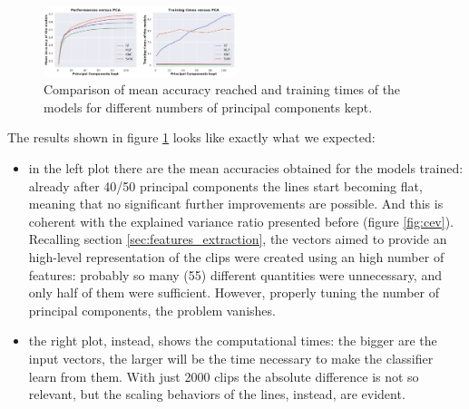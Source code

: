 \begin{figure}[!h]
	\centering
	\includegraphics[width=0.5\textwidth]{pictures/pca_analysis.pdf}
	\caption{Comparison of mean accuracy reached and training times of the models for different numbers of principal components kept.}
	\label{fig:pca_analysis}
\end{figure}
The results shown in figure \ref{fig:pca_analysis} looks like exactly what we expected:
\begin{itemize}
	\itemsep0em
	\item in the left plot there are the mean accuracies obtained for the models trained: already after 40/50 principal components the lines start becoming flat, meaning that no significant further improvements are possible. And this is coherent with the explained variance ratio presented before (figure \ref{fig:cev}). Recalling section \ref{sec:features_extraction}, the vectors aimed to provide an high-level representation of the clips were created using an high number of features: probably so many (55) different quantities were unnecessary, and only half of them were sufficient. However, properly tuning the number of principal components, the problem vanishes.
	\item the right plot, instead, shows the computational times: the bigger are the input vectors, the larger will be the time necessary to make the classifier learn from them. With just 2000 clips the absolute difference is not so relevant, but the scaling behaviors of the lines, instead, are evident.
\end{itemize}


